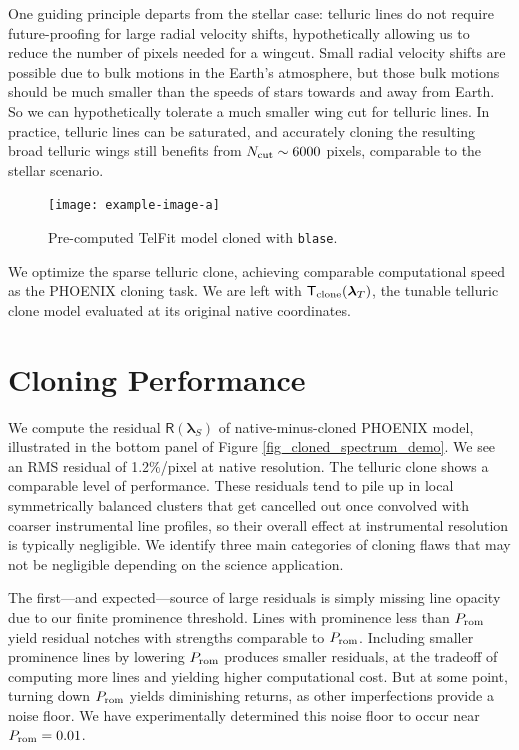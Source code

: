 \documentclass[twocolumn]{aastex631}
\begin{document}
One guiding principle departs from the stellar case: telluric lines do not require future-proofing for large radial velocity shifts, hypothetically allowing us to reduce the number of pixels needed for a wingcut.  Small radial velocity shifts are possible due to bulk motions in the Earth's atmosphere, but those bulk motions should be much smaller than the speeds of stars towards and away from Earth.  So we can hypothetically tolerate a much smaller wing cut for telluric lines.  In practice, telluric lines can be saturated, and accurately cloning the resulting broad telluric wings still benefits from $N_{\rm cut}\sim6000$ pixels, comparable to the stellar scenario.

\begin{figure}[hbt!]
    \centering
    \texttt{[image: example-image-a]}
    \caption{Pre-computed TelFit model cloned with \texttt{blase}.}
    \label{fig_telluric_clone}
\end{figure}


We optimize the sparse telluric clone, achieving comparable computational speed as the PHOENIX cloning task.  We are left with $\mathsf{T}_{\rm clone}(\bm{\lambda}_T)$, the tunable telluric clone model evaluated at its original native coordinates.


\section{Cloning Performance}

We compute the residual $\mathsf{R}(\bm{\lambda}_S)$ of native-minus-cloned PHOENIX model, illustrated in the bottom panel of Figure \ref{fig_cloned_spectrum_demo}. We see an RMS residual of 1.2\%/pixel at native resolution.  The telluric clone shows a comparable level of performance.  These residuals tend to pile up in local symmetrically balanced clusters that get cancelled out once convolved with coarser instrumental line profiles, so their overall effect at instrumental resolution is typically negligible.  We identify three main categories of cloning flaws that may not be negligible depending on the science application.

The first---and expected---source of large residuals is simply missing line opacity due to our finite prominence threshold. Lines with prominence less than $P_{\rm rom}$ yield residual notches with strengths comparable to $P_{\rm rom}$. Including smaller prominence lines by lowering $P_{\rm rom}$ produces smaller residuals, at the tradeoff of computing more lines and yielding higher computational cost.  But at some point, turning down $P_{\rm rom}$ yields diminishing returns, as other imperfections provide a noise floor.  We have experimentally determined this noise floor to occur near $P_{\rm rom}=0.01$.
\end{document}
